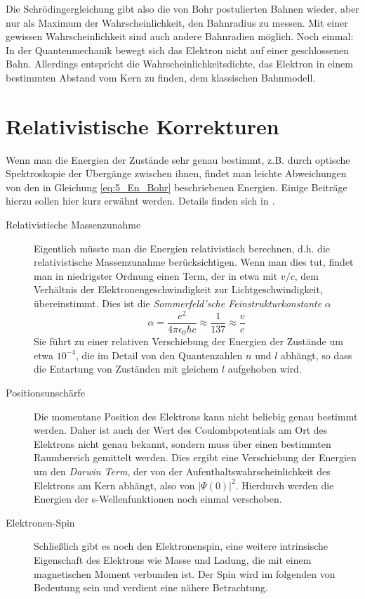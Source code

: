 Die Schrödingergleichung gibt also die von Bohr postulierten Bahnen wieder, aber nur als Maximum der Wahrscheinlichkeit, den Bahnradius zu messen. Mit einer gewissen Wahrscheinlichkeit sind auch andere Bahnradien möglich. Noch einmal: In der Quantenmechanik bewegt sich das Elektron nicht auf einer geschlossenen Bahn. Allerdings entspricht die Wahrscheinlichkeitsdichte, das Elektron in einem bestimmten Abstand vom Kern zu finden, dem klassischen Bahnmodell.



\section{Relativistische Korrekturen}


Wenn man die Energien der Zustände sehr genau bestimmt, z.B. durch optische Spektroskopie der Übergänge zwischen ihnen, findet man leichte Abweichungen von den in Gleichung \ref{eq:5_En_Bohr} beschriebenen Energien. Einige Beiträge hierzu sollen hier kurz erwähnt werden. Details finden sich in \cite{Demtröder_ep3}.
\begin{description}
    \item[Relativistische Massenzunahme]  Eigentlich müsste man die Energien relativistisch berechnen, d.h. die relativistische Massenzunahme berücksichtigen. Wenn man dies tut, findet man in niedrigster Ordnung einen Term, der in etwa mit $v/c$, dem Verhältnis der Elektronengeschwindigkeit zur Lichtgeschwindigkeit, übereinstimmt. Dies ist die \emph{Sommerfeld'sche Feinstrukturkonstante} $\alpha$
\begin{equation}
    \alpha = \frac{e^2}{4 \pi \epsilon_0 \hbar c} \approx \frac{1}{137} \approx \frac{v}{c}
\end{equation}
Sie führt zu einer relativen Verschiebung der Energien der Zustände um etwa $10^{-4}$, die im Detail von den Quantenzahlen $n$ und $l$ abhängt, so dass die Entartung von Zuständen mit gleichem $l$ aufgehoben wird. 

    \item[Positionsunschärfe] Die momentane Position des Elektrons kann nicht beliebig genau bestimmt werden. Daher ist auch der Wert des Coulombpotentials am Ort des Elektrons nicht genau bekannt, sondern muss über einen bestimmten Raumbereich gemittelt werden. Dies ergibt eine Verschiebung der Energien um den \emph{Darwin Term}, der von der Aufenthaltswahrscheinlichkeit des Elektrons am Kern abhängt, also von $|\Psi(0)|^2$. Hierdurch werden die Energien der s-Wellenfunktionen noch einmal verschoben.
    
    \item[Elektronen-Spin]  Schließlich gibt es noch den Elektronenspin, eine weitere intrinsische Eigenschaft des Elektrons wie Masse und Ladung, die mit einem magnetischen Moment verbunden ist. Der Spin wird im folgenden von Bedeutung sein und verdient eine nähere Betrachtung.
\end{description}




